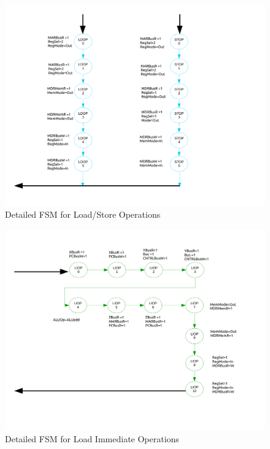 \documentclass[conference]{IEEEtran}
\begin{document}
\begin{figure}[!t]
\centering
\includegraphics[width=\textwidth]{ControlFSMp3.pdf}
\caption{Detailed FSM for Load/Store Operations}
\label{fig_sim}
\end{figure}


\clearpage

\begin{figure}[!t]
\centering
\includegraphics[width=\textwidth]{ControlFSMp4.pdf}
\caption{Detailed FSM for Load Immediate Operations}
\label{fig_sim}
\end{figure}

\clearpage
\end{document}
